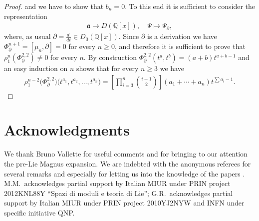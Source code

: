 \documentclass[pdftex]{sigma}
\newcommand{\de}{\partial}
\newcommand{\Q}{\mathbb{Q}}
\numberwithin{equation}{section}
\begin{document}
\begin{proof}
and we have to show that $b_n=0$. To this end it is suf\/f\/icient to consider the representation
\begin{gather*} \mathfrak{a}\to D(\Q[x]),\quad \Psi\mapsto \Psi_\de,\end{gather*}
where, as usual $\de=\frac{d~}{dt}\in D_0(\Q[x])$. Since $\de$ is a derivation we have
$\Phi^{n+1}_\de=[\mu_n,\de]=0$ for every $n\ge 0$, and therefore it is suf\/f\/icient to prove that $\rho_1^{n}(\Phi^{2,2}_\de)\not=0$ for every $n$.
By construction $\Phi^{2,2}_\de(t^a,t^b)=(a+b)t^{a+b-1}$ and an easy induction on $n$ shows that for every $n\ge 3$ we have
\begin{gather*} \rho_1^{n-2}\big(\Phi^{2,2}_\de\big)\big(t^{a_1},t^{a_2},\ldots,t^{a_n}\big)=
\left[\prod_{i=3}^n\binom{i-1}{2}\right](a_1+\cdots+a_n)t^{\sum a_i-1}.\tag*{\qed}\end{gather*}
\renewcommand{\qed}{}
\end{proof}

\section*{Acknowledgments} We thank Bruno Vallette for useful comments and for bringing to our attention the pre-Lie Magnus expansion. We are indebted with the anonymous referees for several remarks and especially for letting us into the knowledge of the papers \cite{Asche,SZ}. M.M.~acknowledges partial support by Italian MIUR under PRIN project 2012KNL88Y ``Spazi di moduli e teoria di Lie''; G.R.~acknowledges partial support by Italian MIUR under PRIN project 2010YJ2NYW and INFN under specif\/ic initiative QNP.
\end{document}
